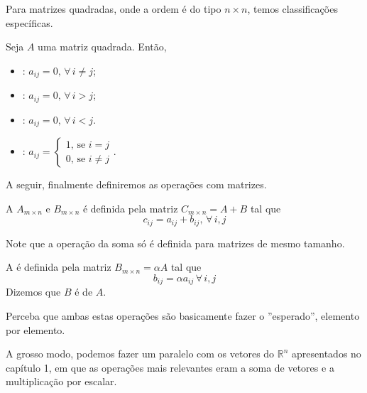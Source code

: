 \documentclass[../main.tex]{subfiles}
\begin{document}
		Para matrizes quadradas, onde a ordem é do tipo $n\times n$, temos classificações específicas.
		\begin{definicao}
			Seja $A$ uma matriz quadrada. Então,
			\begin{itemize}
				\item {}: $a_{ij}=0,\, \forall\, i\neq j$;
				\item {}: $a_{ij}=0,\, \forall\, i>j$;
				\item {}: $a_{ij}=0,\, \forall\, i<j$.
				\item {}: $a_{ij}=\begin{cases}
					1 \text{, se } i=j\\
					0 \text{, se } i\neq j
				\end{cases}$.
			\end{itemize}
		\end{definicao}
		A seguir, finalmente definiremos as operações com matrizes.
		\begin{definicao}
			A  $A_{m\times n}$ e $B_{m\times n}$ é definida pela matriz $C_{m\times n}=A+B$ tal que
			\[
			c_{ij}=a_{ij}+b_{ij},\, \forall\, i, j
			\]
		\end{definicao}
		Note que a operação da soma só é definida para matrizes de mesmo tamanho.
		\begin{definicao}
			A  é definida pela matriz $B_{m\times n}=\alpha A$ tal que
			\[
			b_{ij}=\alpha a_{ij}\, \forall\, i,j
			\]
			Dizemos que $B$ é  de $A$.
		\end{definicao}
		Perceba que ambas estas operações são basicamente fazer o ''esperado'', elemento por elemento.
		
		A grosso modo, podemos fazer um paralelo com os vetores do $\mathbb{R}^n$ apresentados no capítulo 1, em que as operações mais relevantes eram a soma de vetores e a multiplicação por escalar. 
		
\end{document}
